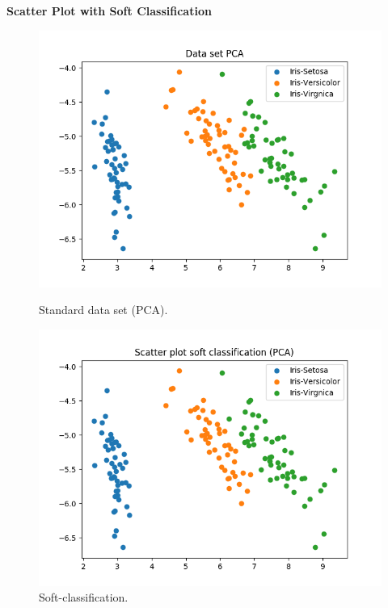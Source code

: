 \documentclass[a4paper]{article}
\begin{document}
\newpage

{\large \textbf{Scatter Plot with Soft Classification}} \\


\begin{figure}[htp]
\begin{minipage}{0.4\textwidth}
	\centering
  \includegraphics[scale=0.6]{plots/basic_scenario3_cmpnt3.png}
  \caption{Standard data set (PCA).}
\end{minipage}
\hfill
\begin{minipage}{0.4\textwidth}
	\centering
  \includegraphics[scale=0.6]{plots/soft_scatter_scenario3_cmpnt3.png}
  \caption{Soft-classification.}
\end{minipage}
\end{figure}
\end{document}
